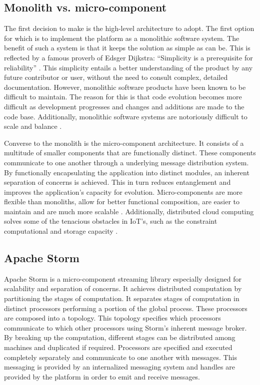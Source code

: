 \subsection{Monolith vs. micro-component}
The first decision to make is the high-level architecture to adopt. The first option for which is to implement the platform as a monolithic software system. The benefit of such a system is that it keeps the solution as simple as can be. This is reflected by a famous proverb of Edsger Dijkstra: ``Simplicity is a prerequisite for reliability'' \cite{dijkstra}. This simplicity entails a better understanding of the product by any future contributor or user, without the need to consult complex, detailed documentation. However, monolithic software products have been known to be difficult to maintain. The reason for this is that code evolution becomes more difficult as development progresses and changes and additions are made to the code base. Additionally, monolithic software systems are notoriously difficult to scale and balance \cite{mono_vs_micro}.

Converse to the monolith is the micro-component architecture. It consists of a multitude of smaller components that are functionally distinct. These components communicate to one another through a underlying message distribution system. By functionally encapsulating the application into distinct modules, an inherent separation of concerns is achieved. This in turn reduces entanglement and improves the application's capacity for evolution. Micro-components are more flexible than monoliths, allow for better functional composition, are easier to maintain and are much more scalable \cite{mono_vs_micro}. Additionally, distributed cloud computing solves some of the tenacious obstacles in IoT's, such as the constraint computational and storage capacity \cite{benefits_cloud_to_iot}.

\subsection{Apache Storm}
Apache Storm is a micro-component streaming library especially designed for scalability and separation of concerns. It achieves distributed computation by partitioning the stages of computation. It separates stages of computation in distinct processors performing a portion of the global process. These processors are composed into a topology. This topology specifies which processors communicate to which other processors using Storm's inherent message broker. By breaking up the computation, different stages can be distributed among machines and duplicated if required. Processors are specified and executed completely separately and communicate to one another with messages. This messaging is provided by an internalized messaging system and handles are provided by the platform in order to emit and receive messages.

